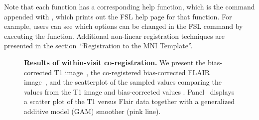 Note that each  function has a corresponding help function, which is the  command appended with , which prints out the FSL help page for that function.  For example, users can see which options can be changed in the FSL  command by executing the  function.   Additional non-linear registration techniques are presented in the section~``Registration to the MNI Template''.  







\begin{figure}
\hfill
\hfill
\caption{{\bf Results of within-visit co-registration.}  We present the bias-corrected T1 image~\protect{}, the co-registered bias-corrected FLAIR image~\protect{}, and the scatterplot of the sampled values comparing the values from the T1 image and bias-corrected values \protect{}. Panel~\protect{} displays a scatter plot of the T1 versus Flair data together with a generalized additive model (GAM) smoother (pink line).  }
\label{fig:coreg}
\end{figure}



